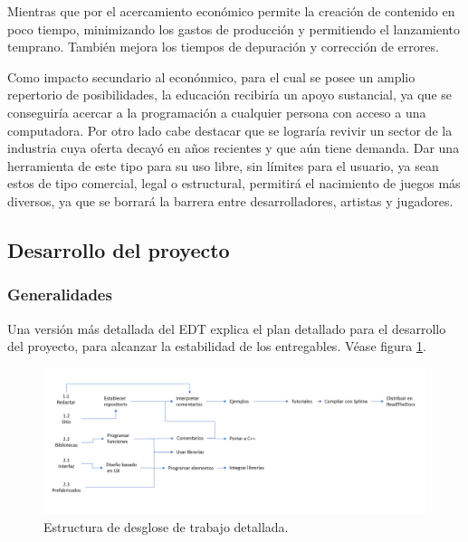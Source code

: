 \documentclass[]{article}
\begin{document}
Mientras que por el acercamiento econ\'omico permite la creaci\'on de contenido en poco tiempo, minimizando los gastos de producci\'on y permitiendo el lanzamiento temprano. Tambi\'en mejora los tiempos de depuraci\'on y correcci\'on de errores. 

Como impacto secundario al econ\'onmico, para el cual se posee un amplio repertorio de posibilidades, la educaci\'on recibir\'ia un apoyo sustancial, ya que se conseguir\'ia acercar a la programaci\'on a cualquier persona con acceso a una computadora. Por otro lado cabe destacar que se lograr\'ia revivir un sector de la industria cuya oferta decay\'o en a\~nos recientes y que a\'un tiene demanda. Dar una herramienta de este tipo para su uso libre, sin l\'imites para el usuario, ya sean estos de tipo comercial, legal o estructural, permitir\'a el nacimiento de juegos m\'as diversos, ya que se borrar\'a la barrera entre desarrolladores, artistas y jugadores.

\subsection{Desarrollo del proyecto} %
\subsubsection{Generalidades}
Una versi\'on m\'as detallada del EDT explica el plan detallado para el desarrollo del proyecto, para alcanzar la estabilidad de los entregables. V\'ease figura \ref{EDT3}.
\begin{figure}[H]
	
	\centering
	\includegraphics[width=1\textwidth]{EDT2}
	\caption{Estructura de desglose de trabajo detallada.} 
	\label{EDT3}
	
\end{figure} 
\end{document}
